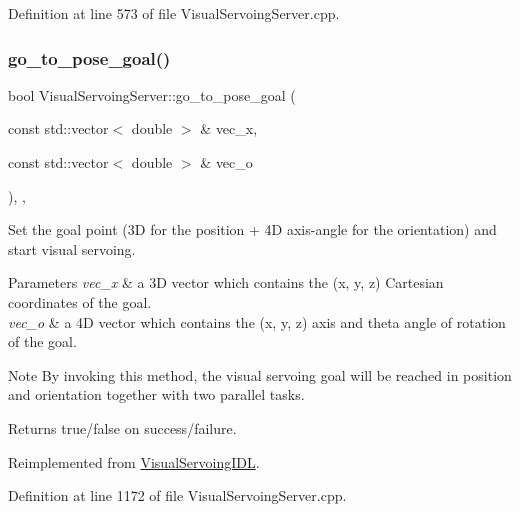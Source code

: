 Definition at line 573 of file Visual\+Servoing\+Server.\+cpp.

\mbox{\label{classVisualServoingServer_a77f26ac40c67d7a9b7e4ad7840532681}} 
\subsubsection{\texorpdfstring{go\+\_\+to\+\_\+pose\+\_\+goal()}{go\_to\_pose\_goal()}}
{\footnotesize\ttfamily bool Visual\+Servoing\+Server\+::go\+\_\+to\+\_\+pose\+\_\+goal (\begin{DoxyParamCaption}\item[{const std\+::vector$<$ double $>$ \&}]{vec\+\_\+x,  }\item[{const std\+::vector$<$ double $>$ \&}]{vec\+\_\+o }\end{DoxyParamCaption})\hspace{0.3cm}{\ttfamily [override]}, {\ttfamily [protected]}, {\ttfamily [virtual]}}



Set the goal point (3D for the position + 4D axis-\/angle for the orientation) and start visual servoing. 


\begin{DoxyParams}{Parameters}
{\em vec\+\_\+x} & a 3D vector which contains the (x, y, z) Cartesian coordinates of the goal. \\
\hline
{\em vec\+\_\+o} & a 4D vector which contains the (x, y, z) axis and theta angle of rotation of the goal. \\
\hline
\end{DoxyParams}
\begin{DoxyNote}{Note}
By invoking this method, the visual servoing goal will be reached in position and orientation together with two parallel tasks. 
\end{DoxyNote}
\begin{DoxyReturn}{Returns}
true/false on success/failure. 
\end{DoxyReturn}


Reimplemented from \hyperlink{classVisualServoingIDL_a697368ff5a1b3f16069d1d10f25ca888}{Visual\+Servoing\+I\+DL}.



Definition at line 1172 of file Visual\+Servoing\+Server.\+cpp.

